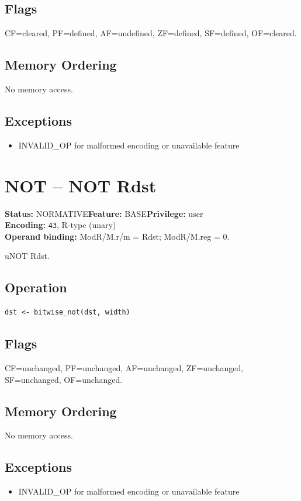 \documentclass[10pt]{article}
\begin{document}
\subsection*{Flags}
CF=cleared, PF=defined, AF=undefined, ZF=defined, SF=defined, OF=cleared.
\subsection*{Memory Ordering}
No memory access.
\subsection*{Exceptions}
\begin{itemize}
\item INVALID\_OP for malformed encoding or unavailable feature
\end{itemize}
\clearpage

\section{NOT -- NOT Rdst}
\textbf{Status:} NORMATIVE\quad \textbf{Feature:} BASE\quad \textbf{Privilege:} user\\
\textbf{Encoding:} \texttt{43}, R-type (unary)\\
\textbf{Operand binding:} ModR/M.r/m = Rdst; ModR/M.reg = 0.

uNOT Rdst.

\subsection*{Operation}
\begin{lstlisting}
dst <- bitwise_not(dst, width)
\end{lstlisting}
\subsection*{Flags}
CF=unchanged, PF=unchanged, AF=unchanged, ZF=unchanged, SF=unchanged, OF=unchanged.
\subsection*{Memory Ordering}
No memory access.
\subsection*{Exceptions}
\begin{itemize}
\item INVALID\_OP for malformed encoding or unavailable feature
\end{itemize}
\clearpage
\end{document}
